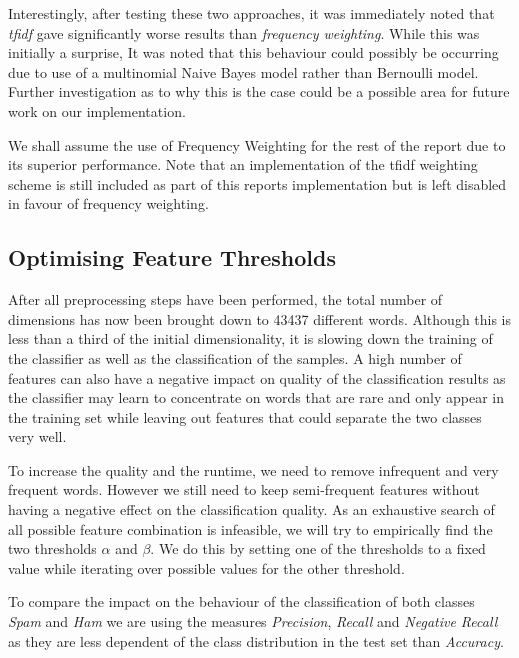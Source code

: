Interestingly, after testing these two approaches, it was immediately noted that \emph{tfidf} gave significantly worse results than \emph{frequency weighting}. While this was initially a surprise, It was noted that this behaviour could possibly be occurring due to use of a multinomial Naive Bayes model rather than Bernoulli model. Further investigation as to why this is the case could be a possible area for future work on our implementation. 

We shall assume the use of Frequency Weighting for the rest of the report due to its superior performance. Note that an implementation of the tfidf weighting scheme is still included as part of this reports implementation but is left disabled in favour of frequency weighting.

\subsection{Optimising Feature Thresholds}
\label{sec:featurethresholds}

After all preprocessing steps have been performed, the total number of dimensions has now been brought down to 43437 different words.
Although this is less than a third of the initial dimensionality, it is slowing down the training of the classifier as well as the classification of the samples.
A high number of features can also have a negative impact on quality of the classification results as the classifier may learn to concentrate on words that are rare and only appear in the training set while leaving out features that could separate the two classes very well.

To increase the quality and the runtime, we need to remove infrequent and very frequent words. However we still need to keep semi-frequent features without having a negative effect on the classification quality.
As an exhaustive search of all possible feature combination is infeasible, we will try to empirically find the two thresholds $\alpha$ and $\beta$.
We do this by setting one of the thresholds to a fixed value while iterating over possible values for the other threshold.



To compare the impact on the behaviour of the classification of both classes \emph{Spam} and \emph{Ham} we are using the measures \emph{Precision}, \emph{Recall} and \emph{Negative Recall} as they are less dependent of the class distribution in the test set than \emph{Accuracy}.


